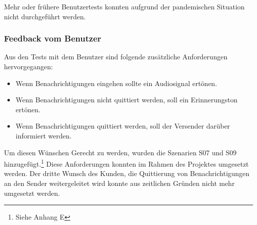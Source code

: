 Mehr oder frühere Benutzertests konnten aufgrund der pandemischen Situation nicht durchgeführt werden.

\subsubsection*{Feedback vom Benutzer}

Aus den Tests mit dem Benutzer sind folgende zusätzliche Anforderungen hervorgegangen:

\begin{itemize}
    \item Wenn Benachrichtigungen eingehen sollte ein Audiosignal ertönen.
    \item Wenn Benachrichtigungen nicht quittiert werden, soll ein Erinnerungston ertönen.
    \item Wenn Benachrichtigungen quittiert werden, soll der Versender darüber informiert werden.
\end{itemize}

Um diesen Wünschen Gerecht zu werden, wurden die Szenarien S07 und S09 hinzugefügt.\footnote{Siehe Anhang E}
Diese Anforderungen konnten im Rahmen des Projektes umgesetzt werden.
Der dritte Wunsch des Kunden, die Quittierung von Benachrichtigungen an den Sender weitergeleitet wird konnte aus zeitlichen Gründen nicht mehr umgesetzt werden.

\clearpage

